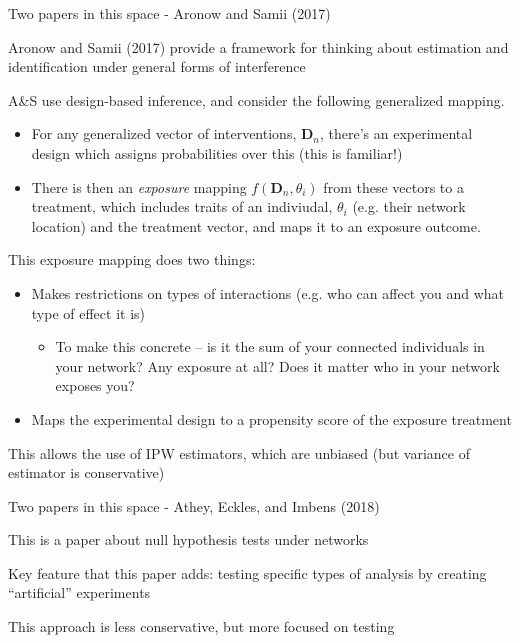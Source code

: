 \documentclass[notes,11pt, aspectratio=169]{beamer}
\newenvironment{wideitemize}{\itemize\addtolength{\itemsep}{10pt}}{\enditemize}
\begin{document}
\begin{frame}{Two papers in this space - Aronow and Samii (2017)}
    \begin{wideitemize}
    \item Aronow and Samii (2017) provide a framework for thinking
      about estimation and identification under general forms of
      interference
    \item A\&S use design-based inference, and consider the following
      generalized mapping.
      \begin{itemize}
      \item For any generalized vector of interventions,
        $\mathbf{D}_{n}$, there's an experimental design which assigns
        probabilities over this (this is familiar!)
      \item There is then an \emph{exposure} mapping
        $f(\mathbf{D}_{n}, \theta_{i})$ from these vectors to a
        treatment, which includes traits of an indiviudal,
        $\theta_{i}$ (e.g. their network location) and the treatment
        vector, and maps it to an exposure outcome.
      \end{itemize}
    \item This exposure mapping does two things:
      \begin{itemize}
      \item Makes restrictions on types of interactions (e.g. who can affect you and what type of effect it is)
        \begin{itemize}
        \item To make this concrete -- is it the sum of your connected
          individuals in your network? Any exposure at all? Does it
          matter who in your network exposes you?
        \end{itemize}
      \item Maps the experimental design to a propensity score of the exposure treatment
      \end{itemize}
    \item This allows the use of IPW estimators, which are unbiased
      (but variance of estimator is conservative)
    \end{wideitemize}
\end{frame}

\begin{frame}{Two papers in this space - Athey, Eckles, and Imbens (2018)}
  \begin{wideitemize}
  \item This is a paper about null hypothesis tests under networks
  \item Key feature that this paper adds: testing specific types of analysis by creating ``artificial'' experiments
  \item This approach is less conservative, but more focused on testing
  \end{wideitemize}
\end{frame}
\end{document}
